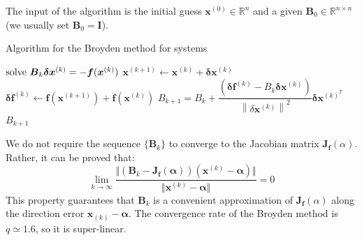 \documentclass[12pt, a4paper]{report}
\newtheorem[style=M,bodystyle=\normalfont]{theorem}{Theorem}
\newtheorem[style=M,bodystyle=\normalfont]{proposition}{Proposition}
\newtheorem[style=M,bodystyle=\normalfont]{corollary}{Corollary}
\newtheorem[style=M,bodystyle=\normalfont]{lemma}{Lemma}
\newtheorem[style=M,bodystyle=\normalfont]{definition}{Definition}
\begin{document}
    The input of the algorithm is the initial guess $\boldsymbol{x}^{(0)} \in \mathbb{R}^n$ and a given $\boldsymbol{B}_0 \in \mathbb{R}^{n \times n}$ (we usually set $\boldsymbol{B}_0=\boldsymbol{I}$). 
    \begin{algorithm}[H]
        \caption{Algorithm for the Broyden method for systems}
            \begin{algorithmic}[1]
                    \State $\textnormal{solve  } \boldsymbol{B}_k\boldsymbol{\delta}\boldsymbol{x}^{(k)}=-\boldsymbol{f}(\boldsymbol{x}^{(k)})$
                    \State $\boldsymbol{x}^{(k+1)} \leftarrow \boldsymbol{x}^{(k)}+\boldsymbol{\delta}\boldsymbol{x}^{(k)}$
                    \State $\boldsymbol{\delta}\boldsymbol{f}^{(k)} \leftarrow \boldsymbol{f}(\boldsymbol{x}^{(k+1)})+\boldsymbol{f}(\boldsymbol{x}^{(k)})$
                    \State $B_{k+1}=B_k+\dfrac{\left(\boldsymbol{\delta}\boldsymbol{f}^{(k)}-B_k\boldsymbol{\delta}\boldsymbol{x}^{(k)}\right)}{{\left\lVert \delta\boldsymbol{x}^{(k)} \right\rVert}^{2}}\boldsymbol{\delta}\boldsymbol{x}^{(k)^T}$
                        \State \Return $B_{k+1}$
                    \EndIf
                \EndFor
            \end{algorithmic}
    \end{algorithm}
    We do not require the sequence $\{\boldsymbol{B}_k\}$ to converge to the Jacobian matrix $\boldsymbol{J}_{\boldsymbol{f}}(\alpha)$. Rather, it can be proved that:
    \[\lim_{k \rightarrow \infty}\dfrac{\Vert \left( \boldsymbol{B}_k-\boldsymbol{J}_{\boldsymbol{f}}(\boldsymbol{\alpha}) \right) \left( \boldsymbol{x}^{(k)}-\boldsymbol{\alpha} \right) \Vert}{\Vert 
    \boldsymbol{x}^{(k)}-\boldsymbol{\alpha} \Vert}=0\]
    This property guarantees that $\boldsymbol{B}_k$ is a convenient approximation of $\boldsymbol{J}_{\boldsymbol{f}}(\alpha)$ along the direction error $\boldsymbol{x}_{(k)}-\boldsymbol{\alpha}$. 
    The convergence rate of the Broyden method is $q \simeq 1.6$, so it is super-linear. 
\end{document}
